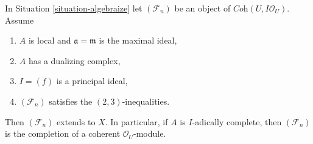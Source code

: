 \begin{lemma}
\label{lemma-algebraization-principal-bis}
In Situation \ref{situation-algebraize} let $(\mathcal{F}_n)$ be an object
of $\textit{Coh}(U, I\mathcal{O}_U)$. Assume
\begin{enumerate}
\item $A$ is local and $\mathfrak a = \mathfrak m$ is the maximal ideal,
\item $A$ has a dualizing complex,
\item $I = (f)$ is a principal ideal,
\item $(\mathcal{F}_n)$ satisfies the $(2, 3)$-inequalities.
\end{enumerate}
Then $(\mathcal{F}_n)$ extends to $X$. In particular, if $A$ is
$I$-adically complete, then $(\mathcal{F}_n)$ is the completion
of a coherent $\mathcal{O}_U$-module. 
\end{lemma}

